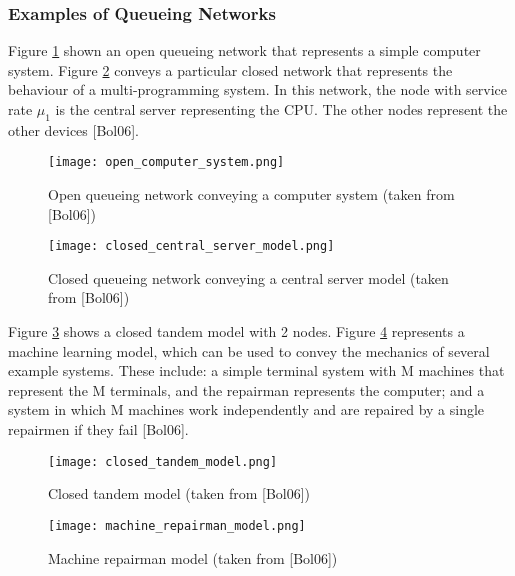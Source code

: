 \documentclass[a4paper,11pt,titlepage]{article}
\begin{document}
\subsubsection{Examples of Queueing Networks}
Figure \ref{fig:openqueueingnetwork} shown an open queueing network that represents a simple computer system. Figure \ref{fig:centralservermodel} conveys a particular closed network that represents the behaviour of a multi-programming system. In this network, the node with service rate $\mu_1$ is the central server representing the CPU. The other nodes represent the other devices [Bol06]. 

\begin{figure}[h!]
\begin{center}
\texttt{[image: open\_computer\_system.png]}
\caption{Open queueing network conveying a computer system (taken from [Bol06])}
\label{fig:openqueueingnetwork}
\end{center}
\end{figure}

\begin{figure}[h!]
\begin{center}
\texttt{[image: closed\_central\_server\_model.png]}
\caption{Closed queueing network conveying a central server model (taken from [Bol06])}
\label{fig:centralservermodel}
\end{center}
\end{figure}

Figure \ref{fig:tandemmodel} shows a closed tandem model with 2 nodes. Figure \ref{fig:machinerepairmanmodel} represents a machine learning model, which can be used to convey the mechanics of several example systems. These include: a simple terminal system with M machines that represent the M terminals, and the repairman represents the computer; and a system in which M machines work independently and are repaired by a single repairmen if they fail [Bol06]. 

\begin{figure}[h!]
\begin{center}
\texttt{[image: closed\_tandem\_model.png]}
\caption{Closed tandem model (taken from [Bol06])}
\label{fig:tandemmodel}
\end{center}
\end{figure}

\begin{figure}[h!]
\begin{center}
\texttt{[image: machine\_repairman\_model.png]}
\caption{Machine repairman model (taken from [Bol06])}
\label{fig:machinerepairmanmodel}
\end{center}
\end{figure}
\end{document}

